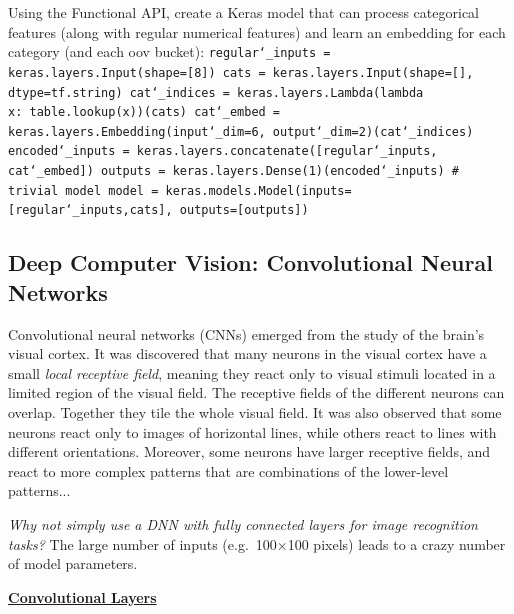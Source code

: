 Using the Functional API, create a Keras model that can process categorical features
(along with regular numerical features)
and learn an embedding for each category (and each oov bucket):\newline
\texttt{regular\char`_inputs = keras.layers.Input(shape=[8])\newline
cats = keras.layers.Input(shape=[], dtype=tf.string)\newline
cat\char`_indices = keras.layers.Lambda(lambda x:~table.lookup(x))(cats)\newline
cat\char`_embed = keras.layers.Embedding(input\char`_dim=6, output\char`_dim=2)(cat\char`_indices)\newline
encoded\char`_inputs = keras.layers.concatenate([regular\char`_inputs, cat\char`_embed])\newline
outputs = keras.layers.Dense(1)(encoded\char`_inputs) \# trivial model\newline
model = keras.models.Model(inputs=[regular\char`_inputs,cats], outputs=[outputs])}

\newpage
\subsection{Deep Computer Vision: Convolutional Neural Networks}

Convolutional neural networks (CNNs) emerged from the study of the brain's visual cortex.
It was discovered that many neurons in the visual cortex have a small \textit{local receptive field},
meaning they react only to visual stimuli located in a limited region of the visual field.
The receptive fields of the different neurons can overlap.
Together they tile the whole visual field.
It was also observed that some neurons react only to images of horizontal lines,
while others react to lines with different orientations.
Moreover, some neurons have larger receptive fields,
and react to more complex patterns that are combinations of the lower-level patterns...

\textit{Why not simply use a DNN with fully connected layers for image recognition tasks?}\newline
The large number of inputs (e.g.~100$\times$100 pixels) leads to a crazy number of model parameters.\newline

\textbf{\underline{Convolutional Layers}}

